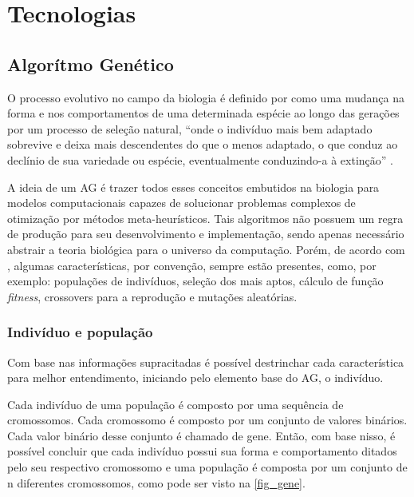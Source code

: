 \chapter{Tecnologias}

\lipsum[1]

\section{Algor{\'i}tmo Gen{\'e}tico}

O processo evolutivo no campo da biologia é definido por
 como uma mudança na forma e
nos comportamentos de uma determinada espécie ao longo das
gerações por um processo de seleção natural, “onde o indivíduo
mais bem adaptado sobrevive e deixa mais descendentes do que o
menos adaptado, o que conduz ao declínio de sua variedade ou
espécie, eventualmente conduzindo-a à extinção”
\cite{do2009alfred}.

A ideia de um AG é trazer todos esses conceitos embutidos na
biologia para modelos computacionais capazes de solucionar
problemas complexos de otimização por métodos
meta-heurísticos. Tais algoritmos não possuem um regra de
produção para seu desenvolvimento e implementação, sendo
apenas necessário abstrair a teoria biológica para o universo
da computação. Porém, de acordo com
, algumas
características, por convenção, sempre estão presentes, como,
por exemplo: populações de indivíduos, seleção dos mais aptos,
cálculo de função \textit{fitness}, crossovers para a reprodução e
mutações aleatórias.

\subsection{Indiv{\'i}duo e popula{\c c}{\~a}o}

Com base nas informações supracitadas é possível destrinchar
cada característica para melhor entendimento, iniciando pelo
elemento base do AG, o indivíduo.

Cada indivíduo de uma população é composto por uma sequência
de cromossomos. Cada cromossomo é composto por um conjunto de
valores binários. Cada valor binário desse conjunto é chamado
de gene. Então, com base nisso, é possível concluir que cada
indivíduo possui sua forma e comportamento ditados pelo seu
respectivo cromossomo e uma população é composta por um
conjunto de n diferentes cromossomos, como pode ser visto na
\autoref{fig_gene}.

